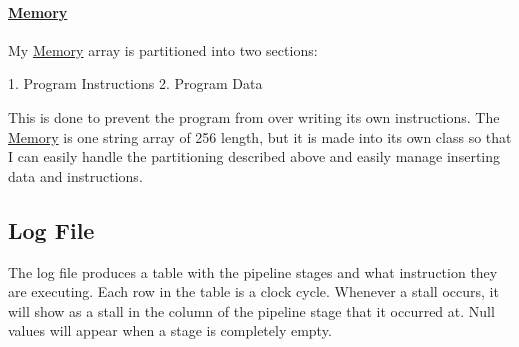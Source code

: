 \paragraph*{\mbox{\hyperlink{class_memory}{Memory}}}

My \mbox{\hyperlink{class_memory}{Memory}} array is partitioned into two sections\+: \begin{DoxyVerb}1. Program Instructions
2. Program Data
\end{DoxyVerb}


This is done to prevent the program from over writing its own instructions. The \mbox{\hyperlink{class_memory}{Memory}} is one string array of 256 length, but it is made into its own class so that I can easily handle the partitioning described above and easily manage inserting data and instructions.

\subsection*{Log File}

The log file produces a table with the pipeline stages and what instruction they are executing. Each row in the table is a clock cycle. Whenever a stall occurs, it will show as a stall in the column of the pipeline stage that it occurred at. Null values will appear when a stage is completely empty. 